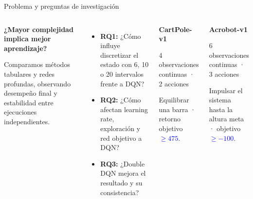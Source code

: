\documentclass[aspectratio=169,10pt,t]{beamer}
\begin{document}
\begin{frame}{Problema y preguntas de investigación}
\begin{columns}[T,onlytextwidth]
\begin{info}
\textbf{¿Mayor complejidad implica mejor aprendizaje?}\par\vspace{.09cm}
\small Comparamos métodos tabulares y redes profundas, observando desempeño final y estabilidad entre ejecuciones independientes.
\end{info}
\vspace{.16cm}
\begin{itemize}\RaggedRight\setlength{\itemsep}{.10cm}
\item \textbf{RQ1:} ¿Cómo influye discretizar el estado con 6, 10 o 20 intervalos frente a DQN?
\item \textbf{RQ2:} ¿Cómo afectan learning rate, exploración y red objetivo a DQN?
\item \textbf{RQ3:} ¿Double DQN mejora el resultado y su consistencia?
\end{itemize}
\begin{info}
{\large\bfseries CartPole-v1}\par\vspace{.08cm}
\small 4 observaciones continuas · 2 acciones\par
\small Equilibrar una barra · retorno objetivo \textbf{\textcolor{Blue}{$\geq475$}}.
\end{info}
\vspace{.15cm}
\begin{info}
{\large\bfseries Acrobot-v1}\par\vspace{.08cm}
\small 6 observaciones continuas · 3 acciones\par
\small Impulsar el sistema hasta la altura meta · objetivo \textbf{\textcolor{Blue}{$\geq-100$}}.
\end{info}
\end{columns}

\end{frame}
\end{document}
